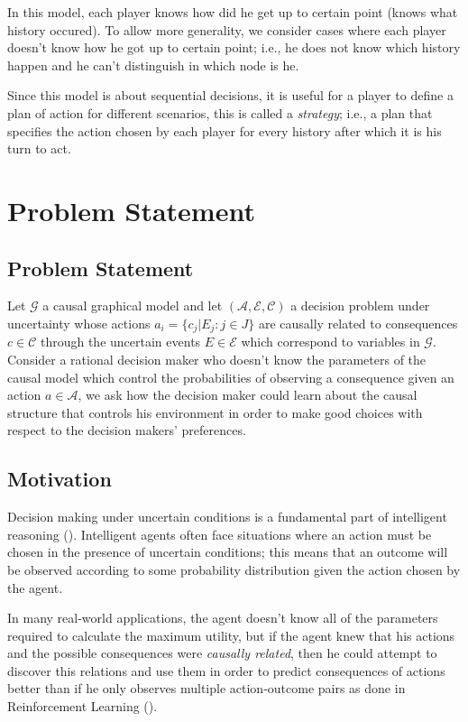 \documentclass[english,letterpaper,12pt,final]{article}
\theoremstyle{definition}
\begin{document}
In this model, each player knows how did he get up to certain point (knows what history occured). To allow more generality, we consider cases where each player doesn't know how he got up to certain point; i.e., he does not know which history happen and he can't distinguish in which node is he.

Since this model is about sequential decisions, it is useful for a player to define a plan of action for different scenarios, this is called a \textit{strategy}; i.e., a plan that specifies the action chosen by each player for every history after which it is his turn to act.

\newpage
\section{Problem Statement}{\label{Problem_Statement}}
	\subsection{Problem Statement}
	Let  $\mathcal{G}$ a causal graphical model and let $(\mathcal{A},\mathcal{E},\mathcal{C})$ a decision problem under uncertainty whose actions $a_i = \{ c_j | E_j : j \in J \}$  are causally related to consequences $c \in \mathcal{C}$ through the uncertain events $E \in \mathcal{E}$ which correspond to variables in $\mathcal{G}$. Consider a rational decision maker who doesn't know the parameters of the causal model which control the probabilities of observing a consequence given an action $a \in \mathcal{A}$, we ask how the decision maker could learn about the causal structure that controls his environment in order to make good choices with respect to the decision makers' preferences.
	\subsection{Motivation}
	Decision making under uncertain conditions is a fundamental part of intelligent reasoning (\cite{lake2017building}). Intelligent agents often face situations where an action must be chosen in the presence of uncertain conditions; this means that an outcome will be observed according to some probability distribution given the action chosen by the agent.
	
	In many real-world applications, the agent doesn't know all of the parameters required to calculate the maximum utility, but if the agent knew that his actions and the possible consequences were \textit{causally related}, then he could attempt to discover this relations and use them in order to predict consequences of actions better than if he only observes multiple action-outcome pairs as done in Reinforcement Learning (\cite{sutton1998reinforcement}). 
	
\end{document}
